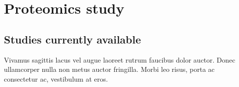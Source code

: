 \chapter{Proteomics study}
\label{sec:proteomics}

\section{Studies currently available}

Vivamus sagittis lacus vel augue laoreet rutrum faucibus dolor auctor. Donec ullamcorper nulla non metus auctor fringilla. Morbi leo risus, porta ac consectetur ac, vestibulum at eros.


